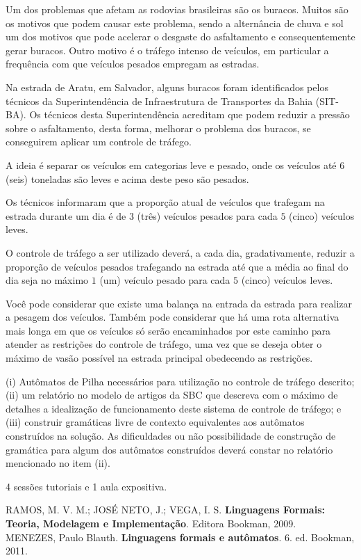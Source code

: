 Um dos problemas que afetam as rodovias brasileiras são os buracos.
Muitos são os motivos que podem causar este problema, sendo a alternância de chuva e sol
um dos motivos que pode acelerar o desgaste do asfaltamento e consequentemente gerar buracos.
Outro motivo é o tráfego intenso de veículos, em particular a frequência com que veículos
pesados empregam as estradas.

Na estrada de Aratu, em Salvador, alguns buracos foram identificados pelos
técnicos da Superintendência de Infraestrutura de Transportes da Bahia (SIT-BA).
Os técnicos desta Superintendência acreditam que
podem reduzir a pressão sobre o asfaltamento, desta forma, melhorar o
problema dos buracos, se conseguirem aplicar um controle de
tráfego.

A ideia é separar os veículos em categorias leve e pesado, onde os
veículos até $6$ (seis) toneladas são leves e acima deste peso são pesados.

Os técnicos informaram que a proporção atual de veículos que trafegam na
estrada durante um dia é de $3$ (três) veículos pesados
para cada $5$ (cinco) veículos leves.

O controle de tráfego a ser utilizado deverá, a cada dia, gradativamente,
reduzir a proporção de veículos pesados trafegando na estrada até que a média
ao final do dia seja no máximo $1$ (um) veículo pesado
para cada $5$ (cinco) veículos leves.

Você pode considerar que existe uma balança na entrada da estrada para realizar a pesagem
dos veículos.
Também pode considerar que há uma rota alternativa mais longa em que os veículos
só serão encaminhados por este caminho para atender as restrições
do controle de tráfego, uma vez que se deseja obter o máximo de vasão
possível na estrada principal obedecendo as restrições.

(i) Autômatos de Pilha necessários para utilização no controle de tráfego descrito;
(ii) um relatório no modelo de artigos da SBC que descreva com o máximo de detalhes a idealização de funcionamento deste
sistema de controle de tráfego;
e (iii) construir gramáticas livre de contexto equivalentes aos autômatos construídos na solução.
As dificuldades ou não possibilidade de construção de gramática para algum dos autômatos construídos
deverá constar no relatório mencionado no item (ii).

4 sessões tutoriais e 1 aula expositiva.


RAMOS, M. V. M.; JOSÉ NETO, J.; VEGA, I. S. \textbf{Linguagens Formais: Teoria, Modelagem e Implementação}. Editora Bookman, 2009.\\

\noindent
MENEZES, Paulo Blauth. \textbf{Linguagens formais e autômatos}. 6. ed. Bookman, 2011.\\
